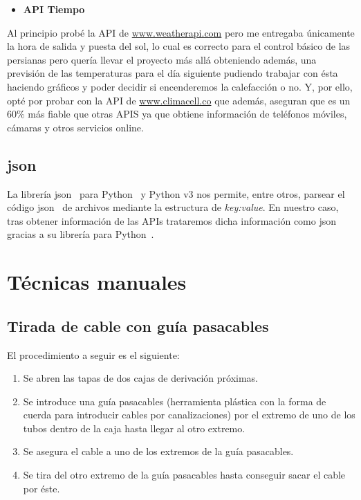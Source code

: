 \begin{itemize}
    \item \textbf{API Tiempo}
\end{itemize}
Al principio probé la API de \url{www.weatherapi.com} pero me entregaba únicamente la hora de salida y puesta del sol, lo cual es correcto para el control básico de las persianas pero quería llevar el proyecto más allá obteniendo además, una previsión de las temperaturas para el día siguiente pudiendo trabajar con ésta haciendo gráficos y poder decidir si encenderemos la calefacción o no. Y, por ello, opté por probar con la API de \url{www.climacell.co} que además, aseguran que es un 60\% más fiable que otras APIS ya que obtiene información de teléfonos móviles, cámaras y otros servicios online.

\subsection{json}
La librería json~\cite{misc:Json} para Python~\cite{misc:Python} y Python v3 nos permite, entre otros, parsear el código json~\cite{misc:Json} de archivos mediante la estructura de \textit{key:value}. En nuestro caso, tras obtener información de las APIs trataremos dicha información como json~\cite{misc:Json} gracias a su librería para Python~\cite{misc:Python}.

\section{Técnicas manuales}

\subsection{Tirada de cable con guía pasacables}
El procedimiento a seguir es el siguiente:
\begin{enumerate}
        \item Se abren las tapas de dos cajas de derivación próximas.
        \item Se introduce una guía pasacables (herramienta plástica con la forma de cuerda para introducir cables por canalizaciones) por el extremo de uno de los tubos dentro de la caja hasta llegar al otro extremo.
        \item Se asegura el cable a uno de los extremos de la guía pasacables.
        \item Se tira del otro extremo de la guía pasacables hasta conseguir sacar el cable por éste.
\end{enumerate}

